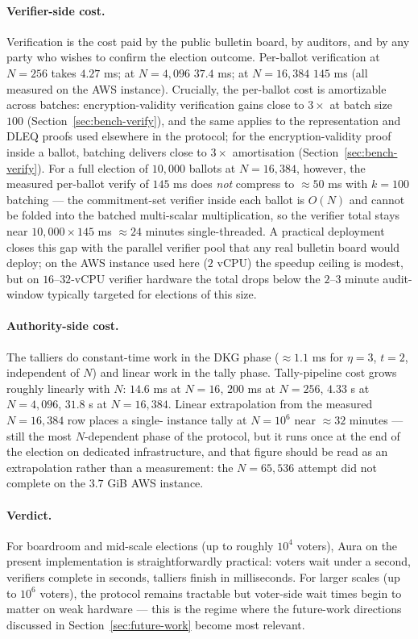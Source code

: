 \documentclass[12pt,a4paper,oneside]{report}
\begin{document}
\paragraph{Verifier-side cost.}
Verification is the cost paid by the public bulletin board, by
auditors, and by any party who wishes to confirm the election outcome.
Per-ballot verification at $N = 256$ takes $4.27$ ms; at $N = 4{,}096$
$37.4$ ms; at $N = 16{,}384$ $145$ ms (all measured on the AWS
instance). Crucially, the per-ballot cost is amortizable across
batches: encryption-validity verification gains close to $3\times$ at
batch size $100$ (Section~\ref{sec:bench-verify}), and the same
applies to the representation and DLEQ proofs used elsewhere in the
protocol; for the encryption-validity proof inside a ballot, batching
delivers close to $3\times$ amortisation
(Section~\ref{sec:bench-verify}). For a full election of
$10{,}000$ ballots at $N = 16{,}384$, however, the measured per-ballot
verify of $145$ ms does \emph{not} compress to $\approx 50$ ms with
$k = 100$ batching --- the commitment-set verifier inside each ballot
is $O(N)$ and cannot be folded into the batched multi-scalar
multiplication, so the verifier total stays near
$10{,}000 \times 145$ ms $\approx 24$ minutes single-threaded. A
practical deployment closes this gap with the parallel verifier pool
that any real bulletin board would deploy; on the AWS instance used
here ($2$ vCPU) the speedup ceiling is modest, but on
$16$--$32$-vCPU verifier hardware the total drops below the
$2$--$3$ minute audit-window typically targeted for elections of this
size.

\paragraph{Authority-side cost.}
The talliers do constant-time work in the DKG phase
($\approx 1.1$ ms for $\eta = 3$, $t = 2$, independent of $N$) and
linear work in the tally phase. Tally-pipeline cost grows roughly
linearly with $N$: $14.6$ ms at $N = 16$, $200$ ms at $N = 256$,
$4.33$ s at $N = 4{,}096$, $31.8$ s at $N = 16{,}384$. Linear
extrapolation from the measured $N = 16{,}384$ row places a single-
instance tally at $N = 10^6$ near $\approx 32$ minutes --- still the
most $N$-dependent phase of the protocol, but it runs once at the end
of the election on dedicated infrastructure, and that figure should be
read as an extrapolation rather than a measurement: the $N = 65{,}536$
attempt did not complete on the $3.7$ GiB AWS instance.

\paragraph{Verdict.} 
For boardroom and mid-scale elections (up to roughly $10^4$ voters), 
Aura on the present implementation is straightforwardly practical: 
voters wait under a second, verifiers complete in seconds, talliers 
finish in milliseconds. For larger scales (up to $10^6$ voters), the 
protocol remains tractable but voter-side wait times begin to matter 
on weak hardware --- this is the regime where the future-work 
directions discussed in Section~\ref{sec:future-work} become most 
relevant.
\end{document}
